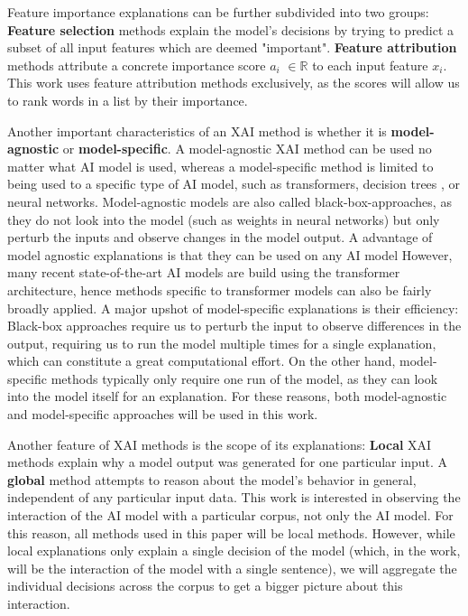 Feature importance explanations can be further subdivided into two groups:
\textbf{Feature selection} methods explain the model's decisions by trying to predict a subset of all input features which are deemed "important".
\textbf{Feature attribution} methods attribute a concrete importance score $a_i$ $\in \mathbb{R}$ to each input feature $x_i$.
This work uses feature attribution methods exclusively, as the scores will allow us to rank words in a list by their importance.

Another important characteristics of an XAI method is whether it is \textbf{model-agnostic} or \textbf{model-specific}.
A model-agnostic XAI method can be used no matter what AI model is used, whereas a model-specific method is limited to being used to a specific type of AI model, such as transformers, decision trees , or neural networks.
Model-agnostic models are also called black-box-approaches, as they do not look into the model (such as weights in neural networks) but only perturb the inputs and observe changes in the model output.
A advantage of model agnostic explanations is that they can be used on any AI model
However, many recent state-of-the-art AI models are build using the transformer architecture, hence methods specific to transformer models can also be fairly broadly applied.
A major upshot of model-specific explanations is their efficiency:
Black-box approaches require us to perturb the input to observe differences in the output, requiring us to run the model multiple times for a single explanation, which can constitute a great computational effort.
On the other hand, model-specific methods typically only require one run of the model, as they can look into the model itself for an explanation.
For these reasons, both model-agnostic and model-specific approaches will be used in this work.

Another feature of XAI methods is the scope of its explanations:
\textbf{Local} XAI methods explain why a model output was generated for one particular input.
A \textbf{global} method attempts to reason about the model's behavior in general, independent of any particular input data.
This work is interested in observing the interaction of the AI model with a particular corpus, not only the AI model.
For this reason, all methods used in this paper will be local methods.
However, while local explanations only explain a single decision of the model (which, in the work, will be the interaction of the model with a single sentence), we will aggregate the individual decisions across the corpus to get a bigger picture about this interaction.


